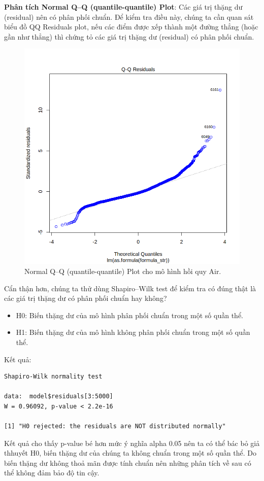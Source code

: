 \textbf{Phân tích Normal Q–Q (quantile-quantile) Plot}: Các giá trị thặng dư (residual) nên có phân phối chuẩn. Để kiểm tra điều này, chúng ta cần quan sát biểu đồ QQ Residuals plot, nếu các điểm được xếp thành một đường thẳng (hoặc gần như thẳng) thì chứng tỏ các giá trị thặng dư (residual) có phân phối chuẩn.
\begin{figure}[H]
    \centering
    \includegraphics[width=0.75\columnwidth]{air_figures/best_model_air_qq.png}
    \caption{Normal Q–Q (quantile-quantile) Plot cho mô hình hồi quy Air.}
    \label{fig:best_model_air_qq}
\end{figure}

Cẩn thận hơn, chúng ta thử dùng Shapiro–Wilk test để kiểm tra có đúng thật là các giá trị thặng dư có phân phối chuẩn hay không?
\begin{itemize}
    \item H0: Biến thặng dư của mô hình phân phối chuẩn trong một số quần thể.
    \item H1: Biến thặng dư của mô hình không phân phối chuẩn trong một số quần thể.
\end{itemize}

Kết quả:
\begin{lstlisting}
Shapiro-Wilk normality test

data:  model$residuals[3:5000]
W = 0.96092, p-value < 2.2e-16

[1] "H0 rejected: the residuals are NOT distributed normally"
\end{lstlisting}

Kết quả cho thấy p-value bé hơn mức ý nghĩa alpha 0.05 nên ta có thể bác bỏ giả thhuyết H0, biến thặng dư của chúng ta không chuẩn trong một số quần thể. Do biến thặng dư không thoả mãn được tính chuẩn nên những phân tích về sau có thể không đảm bảo độ tin cậy.

